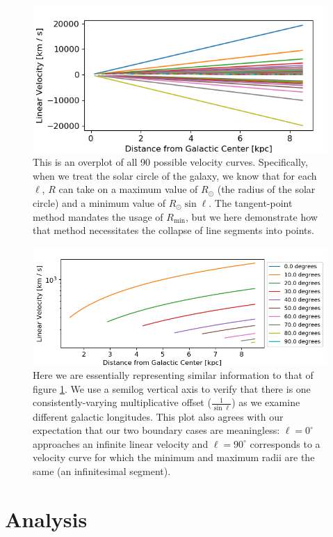 \documentclass[12pt]{article}
\begin{document}
\begin{figure}
	\centering
	\includegraphics[width=.8\linewidth]{tangentPoint_dispersion}
	\caption{This is an overplot of all 90 possible velocity curves. Specifically, when we treat the solar circle of the galaxy, we know that for each $\ell$, $R$ can take on a maximum value of $R_\odot$ (the radius of the solar circle) and a minimum value of $R_\odot \sin \ell$. The tangent-point method mandates the usage of $R_\text{min}$, but we here demonstrate how that method necessitates the collapse of line segments into points.}
	\label{fig:TP_disp}
\end{figure}

\begin{figure}
	\centering
	\includegraphics[width=.9\linewidth]{tangentPoint_selected_dispersions}
	\caption{Here we are essentially representing similar information to that of figure \ref{fig:TP_disp}. We use a semilog vertical axis to verify that there is one consistently-varying multiplicative offset ($\frac{1}{\sin \ell}$) as we examine different galactic longitudes. This plot also agrees with our expectation that our two boundary cases are meaningless: $\ell = 0^\circ$ approaches an infinite linear velocity and $\ell = 90^\circ$ corresponds to a velocity curve for which the minimum and maximum radii are the same (an infinitesimal segment).}
	\label{fig:TP_sel_disp}
\end{figure}

\section{Analysis}
\end{document}

